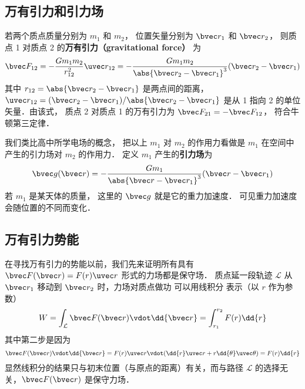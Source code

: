 

\subsection{万有引力和引力场}

若两个质点质量分别为 $m_1$ 和 $m_2$， 位置矢量分别为 $\bvec r_1$ 和 $\bvec r_2$， 则质点 1 对质点 2 的\textbf{万有引力（gravitational force）} 为
\begin{equation}\label{Gravty_eq1}
\bvec F_{12} =  - \frac{G m_1 m_2}{r_{12}^2} \uvec r_{12} = - \frac{G m_1 m_2}{\abs{\bvec r_2 - \bvec r_1}^3}(\bvec r_2 - \bvec r_1)
\end{equation}
其中 $r_{12} = \abs{\bvec r_2 - \bvec r_1}$ 是两点间的距离，$\uvec r_{12} = (\bvec r_2 - \bvec r_1)/\abs{\bvec r_2 - \bvec r_1}$ 是从 1 指向 2 的单位矢量．由该式， 质点 2 对质点 1 的万有引力为 $\bvec F_{21} = -\bvec F_{12}$， 符合牛顿第三定律．

我们类比高中所学电场的概念， 把以上 $m_1$ 对 $m_2$ 的作用力看做是 $m_1$ 在空间中产生的引力场对 $m_2$ 的作用力． 定义 $m_1$ 产生的\textbf{引力场}为
\begin{equation}\label{Gravty_eq2}
\bvec g(\bvec r) = -\frac{Gm_1}{\abs{\bvec r - \bvec r_1} ^3}(\bvec r - \bvec r_1)
\end{equation}
若 $m_1$ 是某天体的质量， 这里的 $\bvec g$ 就是它的重力加速度． 可见重力加速度会随位置的不同而变化．

\subsection{万有引力势能}

在寻找万有引力的势能以前，我们先来证明所有具有 $\bvec F(\bvec r) = F(r) \uvec r$ 形式的力场都是保守场． 质点延一段轨迹 $\mathcal{L}$ 从 $\bvec r_1$ 移动到 $\bvec r_2$ 时，力场对质点做功 可以用线积分 表示（以 $r$ 作为参数）
\begin{equation}\label{Gravty_eq3}
W = \int_\mathcal{L} \bvec F(\bvec r) \vdot \dd{\bvec r} = \int_{r_1}^{r_2} F(r) \dd{r}
\end{equation}
其中第二步是因为
\begin{equation}
\bvec F(\bvec r) \vdot \dd{\bvec r} = F(r)\uvec  r \vdot (\dd{r} \uvec  r + r\dd{\theta} \uvec \theta ) = F(r) \dd{r}
\end{equation}
显然线积分的结果只与初末位置（与原点的距离）有关，而与路径 $\mathcal{L}$ 的选择无关，$\bvec F(\bvec r)$ 是保守力场．

